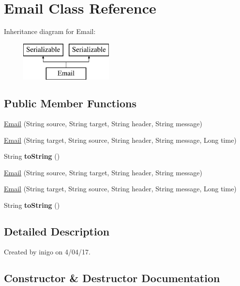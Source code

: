 \hypertarget{class_email}{}\section{Email Class Reference}
\label{class_email}
Inheritance diagram for Email\+:\begin{figure}[H]
\begin{center}
\leavevmode
\includegraphics[height=2.000000cm]{class_email}
\end{center}
\end{figure}
\subsection*{Public Member Functions}
\begin{DoxyCompactItemize}
\item 
\hyperlink{class_email_aeb3e50d5f8a615a8320d14f0b391f325}{Email} (String source, String target, String header, String message)
\item 
\hyperlink{class_email_ac5e2d95c5f91c21ecba14dc3db380f6a}{Email} (String target, String source, String header, String message, Long time)
\item 
\mbox{\label{class_email_ada3a942a6a2471322bf1fa6ab44e0dbd}} 
String {\bfseries to\+String} ()
\item 
\hyperlink{class_email_aeb3e50d5f8a615a8320d14f0b391f325}{Email} (String source, String target, String header, String message)
\item 
\hyperlink{class_email_ac5e2d95c5f91c21ecba14dc3db380f6a}{Email} (String target, String source, String header, String message, Long time)
\item 
\mbox{\label{class_email_ada3a942a6a2471322bf1fa6ab44e0dbd}} 
String {\bfseries to\+String} ()
\end{DoxyCompactItemize}


\subsection{Detailed Description}
Created by inigo on 4/04/17. 

\subsection{Constructor \& Destructor Documentation}
\mbox{\label{class_email_aeb3e50d5f8a615a8320d14f0b391f325}} 
